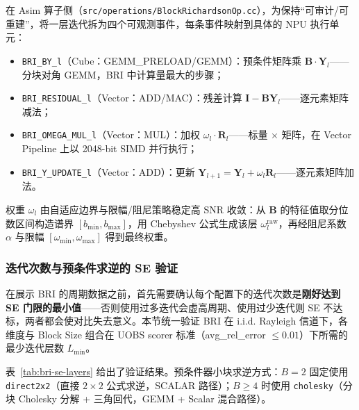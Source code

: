     在 Asim 算子侧（\texttt{src/operations/BlockRichardsonOp.cc}），为保持“可审计/可重建”，将一层迭代拆为四个可观测事件，每条事件映射到具体的
    NPU 执行单元：
    \begin{itemize}
        \item \texttt{BRI\_BY\_l}（Cube：GEMM\_PRELOAD/GEMM）：预条件矩阵乘 $\bm{B}
            \cdot\bm{Y}_{l}$——分块对角 GEMM，BRI 中计算量最大的步骤；

        \item \texttt{BRI\_RESIDUAL\_l}（Vector：ADD/MAC）：残差计算 $\bm{I}-\bm{BY}
            _{l}$——逐元素矩阵减法；

        \item \texttt{BRI\_OMEGA\_MUL\_l}（Vector：MUL）：加权 $\omega_{l}\cdot\bm
            {R}_{l}$——标量 $\times$ 矩阵，在 Vector Pipeline 上以 2048-bit SIMD
            并行执行；

        \item \texttt{BRI\_Y\_UPDATE\_l}（Vector：ADD）：更新 $\bm{Y}_{l+1}=\bm{Y}
            _{l}+\omega_{l}\bm{R}_{l}$——逐元素矩阵加法。
    \end{itemize}

    权重 $\omega_{l}$ 由自适应边界与限幅/阻尼策略稳定高 SNR 收敛：从 $\bm{B}$ 的特征值取分位数区间构造谱界
    $[b_{\min},b_{\max}]$，用 Chebyshev 公式生成该层 $\omega_{l}^{\text{raw}}$，再经阻尼系数
    $\alpha$ 与限幅 $[\omega_{\min},\omega_{\max}]$ 得到最终权重。

    \subsubsection{迭代次数与预条件求逆的 SE 验证}
    \label{sec:bri-se-verify}

    在展示 BRI 的周期数据之前，首先需要确认每个配置下的迭代次数是\textbf{刚好达到
    SE 门限的最小值}——否则使用过多迭代会虚高周期、使用过少迭代则 SE
    不达标，两者都会使对比失去意义。本节统一验证 BRI 在 i.i.d. Rayleigh 信道下，各维度与
    Block Size 组合在 UOBS scorer 标准（avg\_rel\_error $\leq 0.01$）下所需的最少迭代层数
    $L_{\min}$。

    表~\ref{tab:bri-se-layers} 给出了验证结果。预条件器小块求逆方式：$B=2$ 固定使用
    \texttt{direct2x2}（直接 $2\times2$ 公式求逆，SCALAR 路径）；$B\ge4$ 时使用
    \texttt{cholesky}（分块 Cholesky 分解 + 三角回代，GEMM + Scalar 混合路径）。

